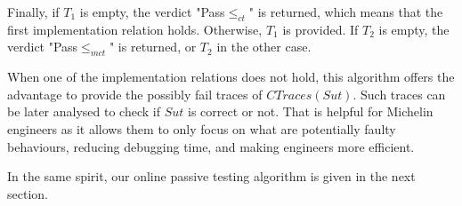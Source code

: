Finally, if $T_1$ is empty, the verdict "Pass$\leq_{ct}$" is
returned, which means that the first implementation relation holds.
Otherwise, $T_1$ is provided. If $T_2$ is empty, the verdict
"Pass$\leq_{mct}$" is returned, or $T_2$ in the other case.

When one of the implementation relations does not hold, this
algorithm offers the advantage to provide the possibly fail
traces of $CTraces({Sut})$. Such traces can be later analysed to
check if $\mathit{Sut}$ is correct or not. That is helpful for
Michelin engineers as it allows them to only focus on what are
potentially faulty behaviours, reducing debugging time, and
making engineers more efficient.

In the same spirit, our online passive testing algorithm is given
in the next section.
